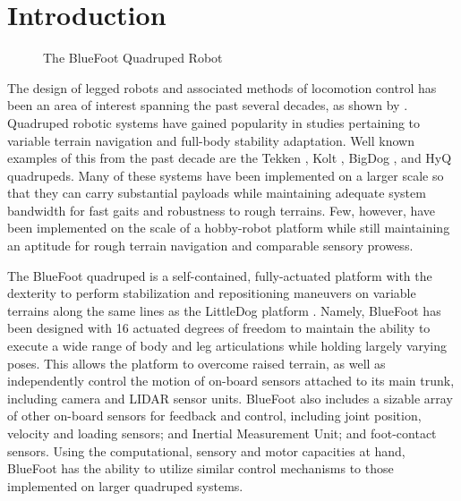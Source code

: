 \chapter{Introduction}
	\label{ch::introduction}
	
	\begin{figure}[h!]
		\centering
		\caption{The BlueFoot Quadruped Robot}
		\label{fig::bluefoot_glamour}
	\end{figure}
		The design of legged robots and associated methods of locomotion control has been an area of interest spanning the past several decades, as shown by		
		\cite{McGhee1965,Hodgins1991,Altendorfer2001,Kolter2008,Wieber2015}. Quadruped robotic systems have gained popularity in studies pertaining to variable terrain navigation and full-body stability adaptation. Well known examples of this from the past decade are the Tekken \cite{Fukuoka2003}, Kolt \cite{Estremera2006}, BigDog \cite{BigDog2008}, and HyQ \cite{Semini2010_PHD} quadrupeds. Many of these systems have been implemented on a larger scale so that they can carry substantial payloads while maintaining adequate system bandwidth for fast gaits and robustness to rough terrains. Few, however, have been implemented on the scale of a hobby-robot platform while still maintaining an aptitude for rough terrain navigation and comparable sensory prowess.

		The BlueFoot quadruped is a self-contained, fully-actuated platform with the dexterity to perform stabilization and repositioning maneuvers on variable terrains along the same lines as the LittleDog platform \cite{Rebula2007}. Namely, BlueFoot has been designed with 16 actuated degrees of freedom to maintain the ability to execute a wide range of body and leg articulations while holding largely varying poses. This allows the platform to overcome raised terrain, as well as independently control the motion of on-board sensors attached to its main trunk, including camera and LIDAR sensor units. BlueFoot also includes a sizable array of other on-board sensors for feedback and control, including joint position, velocity and loading sensors; and Inertial Measurement Unit; and foot-contact sensors. Using the computational, sensory and motor capacities at hand, BlueFoot has the ability to utilize similar control mechanisms to those implemented on larger quadruped systems. 

